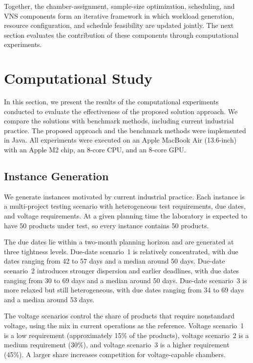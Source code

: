 \documentclass[11pt]{article}
\begin{document}
Together, the chamber-assignment, sample-size optimization, scheduling, and VNS components form an iterative framework in which workload generation, resource configuration, and schedule feasibility are updated jointly. The next section evaluates the contribution of these components through computational experiments.

\section{Computational Study}
\label{sec:computational_study}

In this section, we present the results of the computational experiments conducted to evaluate the effectiveness of the proposed solution approach. We compare the solutions with benchmark methods, including current industrial practice. The proposed approach and the benchmark methods were implemented in Java. All experiments were executed on an Apple MacBook Air (13.6-inch) with an Apple M2 chip, an 8-core CPU, and an 8-core GPU.

\subsection{Instance Generation}
\label{subsec:exp_design}
\label{subsec:experimental_design}

We generate instances motivated by current industrial practice. Each instance is a multi-project testing scenario with heterogeneous test requirements, due dates, and voltage requirements. At a given planning time the laboratory is expected to have 50 products under test, so every instance contains 50 products.

The due dates lie within a two-month planning horizon and are generated at three tightness levels. Due-date scenario~1 is relatively concentrated, with due dates ranging from 42 to 57 days and a median around 50 days. Due-date scenario~2 introduces stronger dispersion and earlier deadlines, with due dates ranging from 30 to 69 days and a median around 50 days. Due-date scenario~3 is more relaxed but still heterogeneous, with due dates ranging from 34 to 69 days and a median around 53 days.

The voltage scenarios control the share of products that require nonstandard voltage, using the mix in current operations as the reference. Voltage scenario~1 is a low requirement (approximately 15\% of the products), voltage scenario~2 is a medium requirement (30\%), and voltage scenario~3 is a higher requirement (45\%). A larger share increases competition for voltage-capable chambers.
\end{document}
